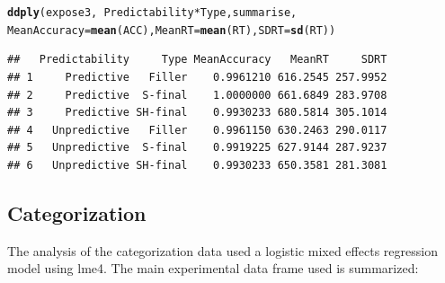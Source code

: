 \documentclass[11pt]{article}\usepackage[]{graphicx}\usepackage[]{color}
\makeatletter
\newcommand{\hlopt}[1]{\textcolor[rgb]{0,0,0}{#1}}%
\newcommand{\hlstd}[1]{\textcolor[rgb]{0.345,0.345,0.345}{#1}}%
\newcommand{\hlkwc}[1]{\textcolor[rgb]{0.333,0.667,0.333}{#1}}%
\newcommand{\hlkwd}[1]{\textcolor[rgb]{0.737,0.353,0.396}{\textbf{#1}}}%
\newenvironment{kframe}{%
 \def\at@end@of@kframe{}%
 \ifinner\ifhmode%
  \def\at@end@of@kframe{\end{minipage}}%
  \begin{minipage}{\columnwidth}%
 \fi\fi%
 \def\FrameCommand##1{\hskip\@totalleftmargin \hskip-\fboxsep
 \colorbox{shadecolor}{##1}\hskip-\fboxsep
     \hskip-\linewidth \hskip-\@totalleftmargin \hskip\columnwidth}%
 \MakeFramed {\advance\hsize-\width
   \@totalleftmargin\z@ \linewidth\hsize
   \@setminipage}}%
 {\par\unskip\endMakeFramed%
 \at@end@of@kframe}
\newenvironment{knitrout}{}{} %
\makeatother
\begin{document}
\begin{knitrout}\footnotesize
{}\color{fgcolor}\begin{kframe}
\begin{alltt}
 \hlkwd{ddply}\hlstd{(expose3,}\hlopt{~}\hlstd{Predictability}\hlopt{*}\hlstd{Type, summarise,}
 \hlkwc{MeanAccuracy} \hlstd{=} \hlkwd{mean}\hlstd{(ACC),} \hlkwc{MeanRT} \hlstd{=} \hlkwd{mean}\hlstd{(RT),} \hlkwc{SDRT} \hlstd{=} \hlkwd{sd}\hlstd{(RT))}
\end{alltt}
\begin{verbatim}
##   Predictability     Type MeanAccuracy   MeanRT     SDRT
## 1     Predictive   Filler    0.9961210 616.2545 257.9952
## 2     Predictive  S-final    1.0000000 661.6849 283.9708
## 3     Predictive SH-final    0.9930233 680.5814 305.1014
## 4   Unpredictive   Filler    0.9961150 630.2463 290.0117
## 5   Unpredictive  S-final    0.9919225 627.9144 287.9237
## 6   Unpredictive SH-final    0.9930233 650.3581 281.3081
\end{verbatim}
\end{kframe}
\end{knitrout}


\subsection{Categorization}

The analysis of the categorization data used a logistic mixed effects regression model using lme4.  The main experimental data frame used is summarized:
\end{document}
